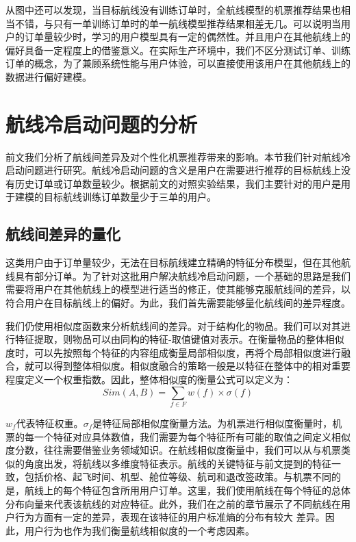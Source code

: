 从图中还可以发现，当目标航线没有训练订单时，全航线模型的机票推荐结果也相当不错，与只有一单训练订单时的单一航线模型推荐结果相差无几。可以说明当用户的订单量较少时，学习的用户模型具有一定的偶然性。并且用户在其他航线上的偏好具备一定程度上的借鉴意义。在实际生产环境中，我们不区分测试订单、训练订单的概念，为了兼顾系统性能与用户体验，可以直接使用该用户在其他航线上的数据进行偏好建模。

\section{航线冷启动问题的分析}
前文我们分析了航线间差异及对个性化机票推荐带来的影响。本节我们针对航线冷启动问题进行研究。航线冷启动问题的含义是用户在需要进行推荐的目标航线上没有历史订单或订单数量较少。根据前文的对照实验结果，我们主要针对的用户是用于建模的目标航线训练订单数量少于三单的用户。

\subsection{航线间差异的量化}

这类用户由于订单量较少，无法在目标航线建立精确的特征分布模型，但在其他航线具有部分订单。为了针对这批用户解决航线冷启动问题，一个基础的思路是我们需要将用户在其他航线上的模型进行适当的修正，使其能够克服航线间的差异，以符合用户在目标航线上的偏好。为此，我们首先需要能够量化航线间的差异程度。

我们仍使用相似度函数来分析航线间的差异。对于结构化的物品。我们可以对其进行特征提取，则物品可以由同构的特征-取值键值对表示。在衡量物品的整体相似度时，可以先按照每个特征的内容组成衡量局部相似度，再将个局部相似度进行融合，就可以得到整体相似度。相似度融合的策略一般是以特征在整体中的相对重要程度定义一个权重指数。因此，整体相似度的衡量公式可以定义为：
\begin{equation}
\label{eq:line_sim}
	Sim(A,B) = \sum_{f \in F}w(f) \times \sigma(f)
\end{equation}

$w_f$代表特征权重。$\sigma_f$是特征局部相似度衡量方法。为机票进行相似度衡量时，机票的每一个特征对应具体数值，我们需要为每个特征所有可能的取值之间定义相似度分数，往往需要借鉴业务领域知识。在航线相似度衡量中，我们可以从与机票类似的角度出发，将航线以多维度特征表示。航线的关键特征与前文提到的特征一致，包括价格、起飞时间、机型、舱位等级、航司和退改签政策。与机票不同的是，航线上的每个特征包含所用用户订单。这里，我们使用航线在每个特征的总体分布向量来代表该航线的对应特征。此外，我们在之前的章节展示了不同航线在用户行为方面有一定的差异，表现在该特征的用户标准熵的分布有较大
差异。因此，用户行为也作为我们衡量航线相似度的一个考虑因素。

